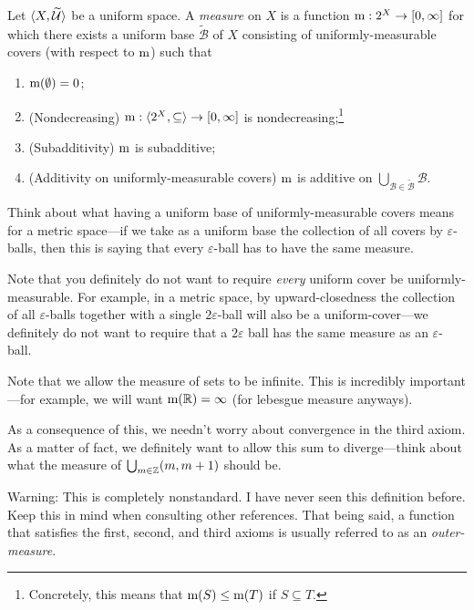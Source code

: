 \begin{dfn}[Measure]\label{Measure}
Let $\langle X,\widetilde{\mathcal{U}}\rangle$ be a uniform space.  A \emph{measure} on $X$ is a function $\mathrm{m} :2^X\rightarrow [0,\infty ]$ for which there exists a uniform base $\widetilde{\mathcal{B}}$ of $X$ consisting of uniformly-measurable covers (with respect to $\mathrm{m}$) such that
\begin{enumerate}
\item \label{Measure.i}$\mathrm{m} (\emptyset )=0$;
\item (Nondecreasing)\label{Measure.Monotonicity} $\mathrm{m} :\langle2^X,\subseteq\rangle\rightarrow [0,\infty ]$ is nondecreasing;\footnote{Concretely, this means that $\mathrm{m} (S)\leq \mathrm{m} (T)$ if $S\subseteq T$.}
\item (Subadditivity) $\mathrm{m}$ is subadditive;
\item (Additivity on uniformly-measurable covers) $\mathrm{m}$ is additive on $\bigcup _{\mathcal{B}\in \widetilde{\mathcal{B}}}\mathcal{B}$.
\end{enumerate}
\begin{rmk}
Think about what having a uniform base of uniformly-measurable covers means for a metric space---if we take as a uniform base the collection of all covers by $\varepsilon$-balls, then this is saying that every $\varepsilon$-ball has to have the same measure.
\end{rmk}
\begin{rmk}
Note that you definitely do not want to require \emph{every} uniform cover be uniformly-measurable.  For example, in a metric space, by upward-closedness the collection of all $\varepsilon$-balls together with a single $2\varepsilon$-ball will also be a uniform-cover---we definitely do not want to require that a $2\varepsilon$ ball has the same measure as an $\varepsilon$-ball.
\end{rmk}
\begin{rmk}
Note that we allow the measure of sets to be infinite.  This is incredibly important---for example, we will want $\mathrm{m} (\mathbb{R} )=\infty$ (for lebesgue measure anyways).
\end{rmk}
\begin{rmk}
As a consequence of this, we needn't worry about convergence in the third axiom.  As a matter of fact, we definitely want to allow this sum to diverge---think about what the measure of $\bigcup _{m\in \mathbb{Z}}(m,m+1)$ should be.
\end{rmk}
\begin{rmk}
Warning:  This is completely nonstandard.  I have never seen this definition before.  Keep this in mind when consulting other references.  That being said, a function that satisfies the first, second, and third axioms is usually referred to as an \emph{outer-measure}.
\end{rmk}
\end{dfn}
